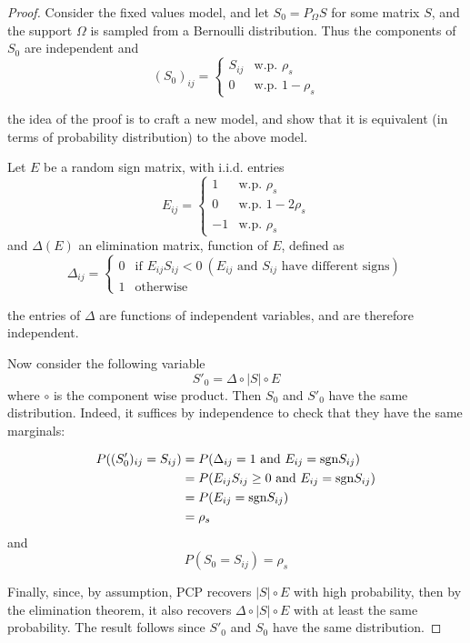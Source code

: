 \begin{proof}
Consider the fixed values model, and let $S_0 = P_\Omega S$ for some matrix $S$, and the support $\Omega$ is sampled from a Bernoulli distribution. Thus the components of $S_0$ are independent and
\[
(S_0)_{ij} = 
\begin{cases}
S_{ij} & \text{w.p. } \rho_s \\
0 & \text{w.p. } 1 - \rho_s
\end{cases}
\]

the idea of the proof is to craft a new model, and show that it is equivalent (in terms of probability distribution) to the above model.

Let $E$ be a random sign matrix, with i.i.d. entries
\[
E_{ij} = 
\begin{cases}
1 & \text{w.p. } \rho_s \\
0 & \text{w.p. } 1 - 2\rho_s\\
-1 & \text{w.p. } \rho_s
\end{cases}
\]
and $\Delta(E)$ an elimination matrix, function of $E$, defined as
\[
\Delta_{ij} = 
\begin{cases}
0 & \text{if } E_{ij}S_{ij} < 0 \ (E_{ij} \text{ and } S_{ij} \text{ have different signs} )\\
1 & \text{otherwise}
\end{cases}
\]

the entries of $\Delta$ are functions of independent variables, and are therefore independent.

Now consider the following variable
\[
S'_0 = \Delta \circ |S| \circ E
\]
where $\circ$ is the component wise product. Then $S_0$ and $S'_0$ have the same distribution. Indeed, it suffices by independence to check that they have the same marginals:

\begin{align*}
P((S'_0)_{ij} = S_{ij}) 
&= P(\Delta_{ij} = 1 \text{ and } E_{ij} = \text{sgn} S_{ij}) \\
&= P(E_{ij}S_{ij} \geq 0 \text{ and } E_{ij} = \text{sgn} S_{ij}) \\
&= P(E_{ij} = \text{sgn} S_{ij}) \\
&= \rho_s
\end{align*}
and
\[
P(S_0 = S_{ij}) = \rho_s
\]

Finally, since, by assumption, PCP recovers $|S| \circ E$ with high probability, then by the elimination theorem, it also recovers $\Delta \circ |S| \circ E$ with at least the same probability. The result follows since $S'_0$ and $S_0$ have the same distribution.
\end{proof}
